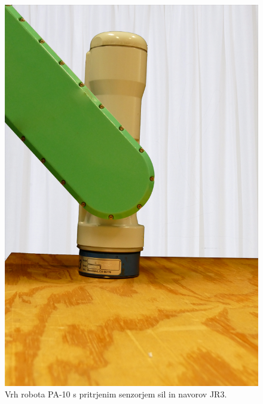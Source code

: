 \begin{figure}
	\centering
	\includegraphics[scale = 0.25]{./Slike/pa10jr3.png}
	\caption{Vrh robota PA-10 s pritrjenim senzorjem sil in navorov JR3.}
	\label{fig:pa10jr3}
\end{figure}
